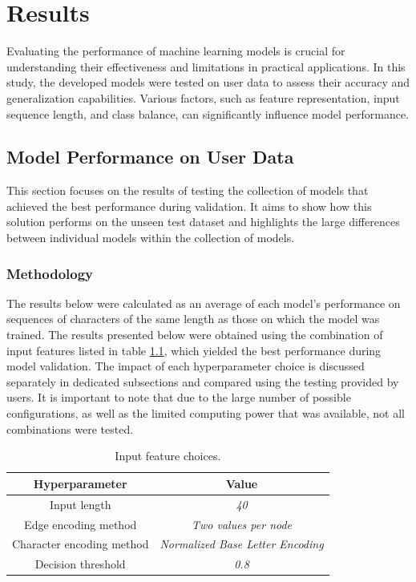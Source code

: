 \chapter{Results}
Evaluating the performance of machine learning models is crucial for understanding their effectiveness and limitations in practical applications. In this study, the developed models were tested on user data to assess their accuracy and generalization capabilities. Various factors, such as feature representation, input sequence length, and class balance, can significantly influence model performance.

\section{Model Performance on User Data}
This section focuses on the results of testing the collection of models that achieved the best performance during validation. It aims to show how this solution performs on the unseen test dataset and highlights the large differences between individual models within the collection of models.

\subsection{Methodology}
The results below were calculated as an average of each model's performance on sequences of characters of the same length as those on which the model was trained.
The results presented below were obtained using the combination of input features listed in table \ref{table:hyperparams}, which yielded the best performance during model validation. The impact of each hyperparameter choice is discussed separately in dedicated subsections and compared using the testing provided by users. It is important to note that due to the large number of possible configurations, as well as the limited computing power that was available, not all combinations were tested.

\begin{center}
	\begin{table}[H]
		
\begin{center}
	\begin{tabular}{ |c|c|} 
		\hline
		Hyperparameter & Value \\
		\hline
		Input length & \textit{40} \\ 
		\hline
		Edge encoding method & \textit{Two values per node} \\		
		\hline 
		Character encoding method & \textit{Normalized Base Letter Encoding} \\		 
		\hline
		Decision threshold & \textit{0.8} \\
		\hline
	\end{tabular}
\end{center}
	\caption{Input feature choices.}
	\label{table:hyperparams}
	\end{table}
\end{center}


